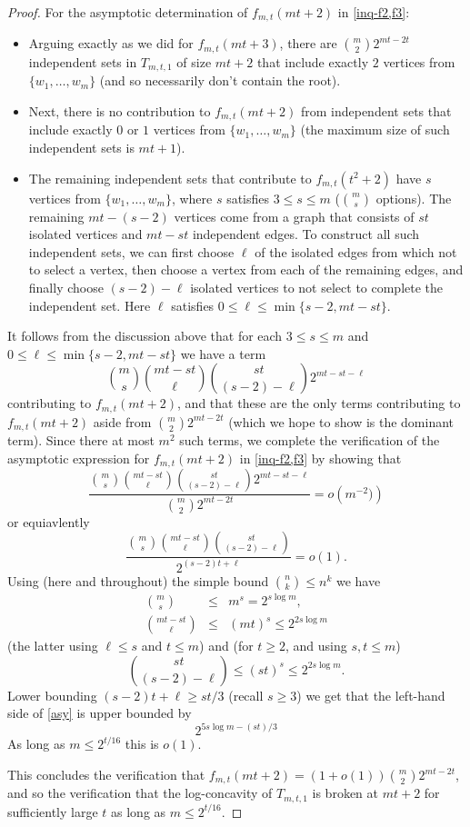 \documentclass[12pt]{article}
\theoremstyle{definition}
\theoremstyle{definition}
\theoremstyle{definition}
\theoremstyle{definition}
\theoremstyle{definition}
\theoremstyle{definition}
\theoremstyle{definition}
\theoremstyle{definition}
\theoremstyle{remark}
\begin{document}
\begin{proof}
For the asymptotic determination of $f_{m,t}(mt+2)$ in \eqref{inq-f2,f3}: 
\begin{itemize}
\item Arguing exactly as we did for $f_{m,t}(mt+3)$, there are $\binom{m}{2}2^{mt-2t}$ independent sets in $T_{m,t,1}$ of size $mt+2$ that include exactly $2$ vertices from $\{w_1, \ldots, w_m\}$ (and so necessarily don't contain the root). 
\item Next, there is no contribution to $f_{m,t}(mt+2)$ from independent sets that include exactly $0$ or $1$ vertices from $\{w_1, \ldots, w_m\}$ (the maximum size of such independent sets is $mt+1$).
\item The remaining independent sets that contribute to $f_{m,t}(t^2+2)$ have $s$ vertices from $\{w_1, \ldots, w_m\}$, where $s$ satisfies $3 \leq s \leq m$ ($\binom{m}{s}$ options). The remaining $mt-(s-2)$ vertices come from a graph that consists of $st$ isolated vertices and $mt-st$ independent edges. To construct all such independent sets, we can first choose $\ell$ of the isolated edges from which not to select a vertex, then choose a vertex from each of the remaining edges, and finally choose $(s-2)-\ell$ isolated vertices to not select to complete the independent set. Here $\ell$ satisfies $0 \leq \ell \leq \min\{s-2,mt-st\}$.   
\end{itemize}
It follows from the discussion above that for each $3 \leq s \leq m$ and $0 \leq \ell \leq \min\{s-2,mt-st\}$ we have a term
$$
\binom{m}{s}\binom{mt-st}{\ell}\binom{st}{(s-2)-\ell}2^{mt-st-\ell}
$$
contributing to $f_{m,t}(mt+2)$, and that these are the only terms contributing to $f_{m,t}(mt+2)$ aside from $\binom{m}{2}2^{mt-2t}$ (which we hope to show is the dominant term). Since there at most $m^2$ such terms, we complete the verification of the asymptotic expression for $f_{m,t}(mt+2)$ in \eqref{inq-f2,f3} by showing that
$$
\frac{\binom{m}{s}\binom{mt-st}{\ell}\binom{st}{(s-2)-\ell}2^{mt-st-\ell}}{\binom{m}{2}2^{mt-2t}} = o\left(m^{-2})\right)
$$
or equiavlently
\begin{equation} \label{asy}
\frac{\binom{m}{s}\binom{mt-st}{\ell}\binom{st}{(s-2)-\ell}}{2^{(s-2)t+\ell}} = o(1).
\end{equation}
Using (here and throughout) the simple bound $\binom{n}{k} \leq n^k$ we have
\begin{eqnarray*}
\binom{m}{s} & \leq & m^s = 2^{s \log m}, \\
\binom{mt-st}{\ell} & \leq & (mt)^s \leq 2^{2s\log m}
\end{eqnarray*}
(the latter using $\ell \leq s$ and $t \leq m$) and (for $t \geq 2$, and using $s,t \leq m$)
$$
\binom{st}{(s-2)-\ell} \leq (st)^s \leq 2^{2s\log m}.
$$
Lower bounding $(s-2)t+\ell \geq st/3$ (recall $s \geq 3$) we get that the left-hand side of \eqref{asy} is upper bounded by 
$$
2^{5s\log m-(st)/3}
$$ 
As long as $m \leq 2^{t/16}$ this is $o(1)$.
 
This concludes the verification that $f_{m,t}(mt+2)=(1+o(1))\binom{m}{2}2^{mt-2t}$, and so the verification that the log-concavity of $T_{m,t,1}$ is broken at $mt+2$ for sufficiently large $t$ as long as $m \leq 2^{t/16}$.
\end{proof}
\end{document}
